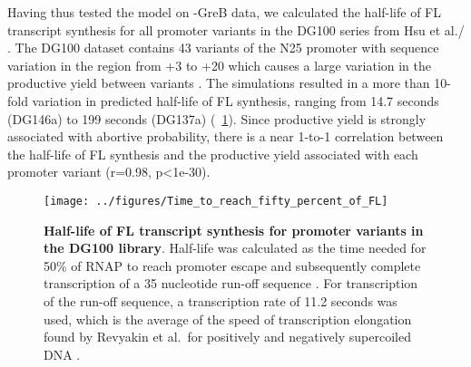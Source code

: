 Having thus tested the model on -GreB data, we calculated the half-life of FL
transcript synthesis for all promoter variants in the DG100 series from
Hsu et al./ \cite{hsu_initial_2006}. The DG100 dataset contains 43 variants of
the N25 promoter with sequence variation in the region from +3 to +20 which
causes a large variation in the productive yield between variants
\cite{hsu_initial_2006}. The simulations resulted in a more than 10-fold
variation in predicted half-life of FL synthesis, ranging from 14.7 seconds
(DG146a) to 199 seconds (DG137a) (\FIG~\ref{fig:dg100_halflives}). Since
productive yield is strongly associated with abortive probability, there is a
near 1-to-1 correlation between the half-life of FL synthesis and the
productive yield associated with each promoter variant (r=0.98, p<1e-30).

\begin{figure}[h]
    \begin{center}
        \texttt{[image: ../figures/Time\_to\_reach\_fifty\_percent\_of\_FL]}
    \end{center}
    \caption{ {\bf Half-life of FL transcript synthesis for promoter variants
        in the DG100 library}. Half-life was calculated as the time needed for
        50\% of RNAP to reach promoter escape and subsequently complete
        transcription of a 35 nucleotide run-off sequence
        \cite{vo_vitro_2003-1}. For transcription of the run-off sequence, a
        transcription rate of 11.2 seconds was used, which is the average of
        the speed of transcription elongation found by Revyakin et al.\ for
        positively and negatively supercoiled DNA
        \cite{revyakin_abortive_2006}.}
    \label{fig:dg100_halflives}
\end{figure}


